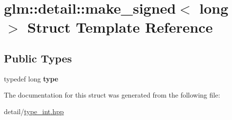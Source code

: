 \hypertarget{structglm_1_1detail_1_1make__signed_3_01long_01_4}{\section{glm\-:\-:detail\-:\-:make\-\_\-signed$<$ long $>$ Struct Template Reference}
\label{structglm_1_1detail_1_1make__signed_3_01long_01_4}
}
\subsection*{Public Types}
\begin{DoxyCompactItemize}
\item 
\hypertarget{structglm_1_1detail_1_1make__signed_3_01long_01_4_ab9807f0a681192166dd820195c967222}{typedef long {\bfseries type}}\label{structglm_1_1detail_1_1make__signed_3_01long_01_4_ab9807f0a681192166dd820195c967222}

\end{DoxyCompactItemize}


The documentation for this struct was generated from the following file\-:\begin{DoxyCompactItemize}
\item 
detail/\hyperlink{type__int_8hpp}{type\-\_\-int.\-hpp}\end{DoxyCompactItemize}
